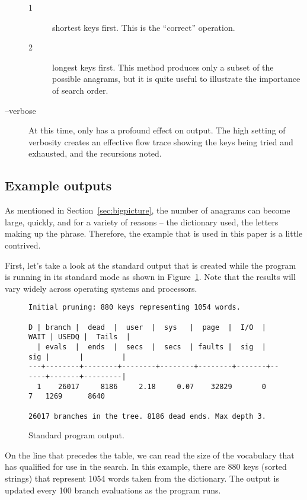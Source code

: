 \documentclass[letterpaper, 11pt]{article}
\begin{document}
\begin{description}
\begin{description}
\item[1] shortest keys first. This is the ``correct''
operation.

\item[2] longest keys first. This method produces only a subset of
the possible anagrams, but it is quite useful to illustrate the
importance of search order.

\end{description}

\item[--verbose] At this time, only  has a profound
effect on output. The high setting of verbosity creates an effective
flow trace showing the keys being tried and exhausted, and the
recursions noted.

\end{description}

\subsection{Example outputs}

As mentioned in Section~\ref{sec:bigpicture}, the number of anagrams
can become large, quickly, and for a variety of reasons -- the
dictionary used, the letters making up the phrase. Therefore, the
example that is used in this paper is a little contrived.

First, let's take a look at the standard output that is created
while the program is running in its standard mode as shown
in Figure~\ref{fig:stdoutput}.  Note that the
results will vary widely across operating systems and processors.

\begin{figure}
\small
\begin{verbatim}
Initial pruning: 880 keys representing 1054 words.

D | branch |  dead  |  user  |  sys   |  page  |  I/O  | WAIT | USEDQ |  Tails  |
  | evals  |  ends  |  secs  |  secs  | faults |  sig  |  sig |       |         |
---+--------+--------+--------+--------+--------+-------+------+-------+---------|
  1    26017     8186     2.18     0.07    32829       0      7   1269      8640

26017 branches in the tree. 8186 dead ends. Max depth 3.
\end{verbatim}
\normalsize
\caption{Standard program output.}
\label{fig:stdoutput}
\end{figure}

On the line that precedes the table, we can read the size of the vocabulary
that has qualified for use in the search. In this example, there are 880 keys
(sorted strings) that represent 1054 words taken from the dictionary. 
The output is updated every 100 branch evaluations as the program runs.
\end{document}
